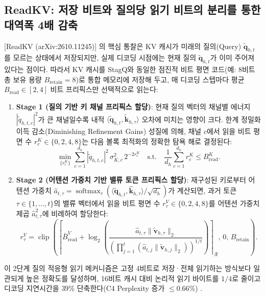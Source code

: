 \documentclass[10pt,a4paper]{article}
\begin{document}
\subsection{\textsf{ReadKV}: 저장 비트와 질의당 읽기 비트의 분리를 통한 대역폭 4배 감축}
[ReadKV (arXiv:2610.11245)] \cite{bhandari2026readkv}의 핵심 통찰은 KV 캐시가 미래의 질의(Query) $\widetilde{\mathbf{q}}_{h,t}$를 모르는 상태에서 저장되지만, 실제 디코딩 시점에는 현재 질의 $\widetilde{\mathbf{q}}_{h,t}$가 이미 주어져 있다는 점이다. 따라서 KV 캐시를 \textsf{StagQ}와 동일한 점진적 비트 평면 코드(예: 8비트 총 보유 용량 $B_{\text{retain}}=8$)로 통합 메모리에 저장해 두고, 매 디코딩 스텝마다 평균 $B_{\text{read}} \in [2, 4]$ 비트 프리픽스만 선택적으로 읽는다:
\begin{enumerate}\setlength{\itemsep}{2pt}\setlength{\parskip}{0pt}
  \item \textbf{Stage 1 (질의 기반 키 채널 프리픽스 할당)}: 현재 질의 벡터의 채널별 에너지 $|\widetilde{q}_{h,t,c}|^2$가 큰 채널일수록 내적 $\langle \widetilde{\mathbf{q}}_{h,t}, \widetilde{\mathbf{k}}_{h,\tau} \rangle$ 오차에 미치는 영향이 크다. 한계 정밀화 이득 감소(Diminishing Refinement Gains) 성질에 의해, 채널 $c$에서 읽을 비트 평면 수 $r_{c}^K \in \{0, 2, 4, 8\}$는 다음 볼록 최적화의 정확한 탐욕 해로 결정된다:
  \begin{equation}
  \min_{\{r_c^K\}} \sum_{c=1}^{d_h} |\widetilde{q}_{h,t,c}|^2 \, \sigma_{K,c}^2 \, 2^{-2 r_c^K} \quad \text{s.t.} \quad \frac{1}{d_h}\sum_{c=1}^{d_h} r_c^K \le B_{\text{read}}^K.
  \label{eq:readkv_key}
  \end{equation}
  \item \textbf{Stage 2 (어텐션 가중치 기반 밸류 토큰 프리픽스 할당)}: 재구성된 키로부터 어텐션 가중치 $\hat{a}_{t,\tau} = \operatorname{softmax}_\tau(\langle \widetilde{\mathbf{q}}_{h,t}, \widehat{\mathbf{k}}_{h,\tau}\rangle / \sqrt{d_h})$가 계산되면, 과거 토큰 $\tau \in \{1,\dots,t\}$의 밸류 벡터에서 읽을 비트 평면 수 $r_\tau^V \in \{0, 2, 4, 8\}$를 어텐션 가중치 제곱 $\hat{a}_{t,\tau}^2$에 비례하여 할당한다:
  \begin{equation}
  r_\tau^V = \operatorname{clip}\!\left( \left\lceil \bar{B}_{\text{read}}^V + \log_2 \left( \frac{\hat{a}_{t,\tau} \|\widetilde{\mathbf{v}}_{h,\tau}\|_2}{\left(\prod_{j=1}^t (\hat{a}_{t,j}\|\widetilde{\mathbf{v}}_{h,j}\|_2)\right)^{1/t}} \right) \right\rceil_{\mathcal{R}}, \, 0, \, B_{\text{retain}} \right).
  \label{eq:readkv_val}
  \end{equation}
\end{enumerate}
이 2단계 질의 적응형 읽기 메커니즘은 고정 4비트로 저장·전체 읽기하는 방식보다 일관되게 높은 정확도를 달성하며, 16비트 캐시 대비 논리적 읽기 바이트를 $1/4$로 줄이고 디코딩 지연시간을 $39\%$ 단축한다(C4 Perplexity 증가 $\le 0.66\%$) \cite{bhandari2026readkv}.
\end{document}
